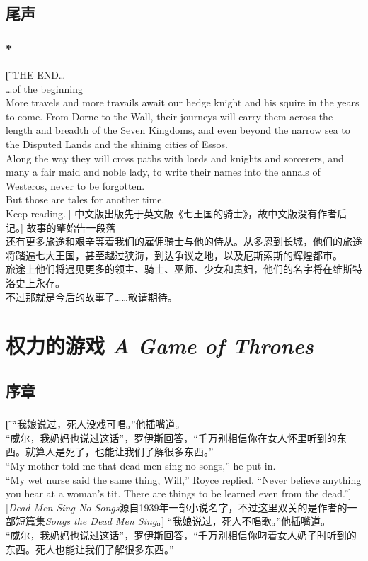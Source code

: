 \documentclass[12pt,a4paper]{article}
\begin{document}
\subsection{尾声}
\subsubsection{\color{red}*}\t[
THE END…\\
…of the beginning\\
More travels and more travails await our hedge knight and his squire in the years to come. From Dorne to the Wall, their journeys will carry them across the length and breadth of the Seven Kingdoms, and even beyond the narrow sea to the Disputed Lands and the shining cities of Essos.\\
Along the way they will cross paths with lords and knights and sorcerers, and many a fair maid and noble lady, to write their names into the annals of Westeros, never to be forgotten.\\
But those are tales for another time.\\
Keep reading.][
中文版出版先于英文版《七王国的骑士》，故中文版没有作者后记。]
故事的肇始告一段落\\
还有更多旅途和艰辛等着我们的雇佣骑士与他的侍从。从多恩到长城，他们的旅途将踏遍七大王国，甚至越过狭海，到达争议之地，以及厄斯索斯的辉煌都市。\\
旅途上他们将遇见更多的领主、骑士、巫师、少女和贵妇，他们的名字将在维斯特洛史上永存。\\
不过那就是今后的故事了……敬请期待。
										
\newpage
\renewcommand\thesection{\Roman{section}}	
\section{权力的游戏 \emph{A Game of Thrones}}
\setcounter{subsection}{-1}
\subsection{序章}

\subsubsection{}\t[
“我娘说过，死人没戏可唱。”他插嘴道。\\“威尔，我奶妈也说过这话”，罗伊斯回答，“千万别相信你在女人怀里听到的东西。就算人是死了，也能让我们了解很多东西。”\\
“My mother told me that dead men sing no songs,” he put in.\\ “My wet nurse said the same thing, Will,” Royce replied. “Never believe anything you hear at a woman's tit. There are things to be learned even from the dead.”]
[\emph{Dead Men Sing No Songs}源自1939年一部小说名字，不过这里双关的是作者的一部短篇集\emph{Songs the Dead Men Sing}。]
“我娘说过，死人不唱歌。”他插嘴道。\\“威尔，我奶妈也说过这话”，罗伊斯回答，“千万别相信你叼着女人奶子时听到的东西。死人也能让我们了解很多东西。”
\end{document}
